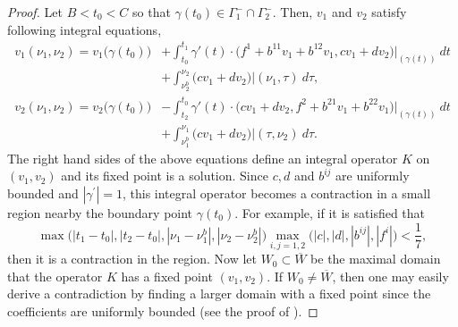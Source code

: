\documentclass[11pt]{amsart}
\theoremstyle{plain}
\numberwithin{equation}{section}
\numberwithin{Thm}{section}
\begin{document}
\begin{proof}
Let $B<t_0<C$ so that $\gamma(t_0) \in \Gamma^-_1 \cap \Gamma^-_2$. Then,
$v_1$ and $v_2$ satisfy following integral equations,
  \begin{align}
    v_1(\nu_1,\nu_2) = v_1\big(\gamma(t_0)\big) &+ \int_{t_0}^{t_1} \gamma'(t) \cdot \big(f^1 + b^{11}v_1 + b^{12} v_1, cv_1 +dv_2 \big)|_{(\gamma(t))} ~dt \label{eqn:int1} \\
    &+\int_{\nu_2^b}^{\nu_2} \big(cv_1 +dv_2 \big)|(\nu_1,\tau) ~d\tau, \nonumber \\
    v_2(\nu_1,\nu_2) = v_2\big(\gamma(t_0)\big) &- \int_{t_2}^{t_0} \gamma'(t) \cdot \big(cv_1 +dv_2, f^2 + b^{21}v_1 + b^{22} v_1 \big)|_{(\gamma(t))} ~dt \label{eqn:int2} \\
    &+\int_{\nu_1^b}^{\nu_1} \big(cv_1 +dv_2 \big)|(\tau,\nu_2) ~d\tau. \nonumber
  \end{align}
The right hand sides of the above equations define an integral operator $K$ on $(v_1,v_2)$ and its fixed point is a solution.  Since $c,d$ and $b^{ij}$ are uniformly bounded and $|\gamma^\prime|=1$, this integral operator becomes a contraction in a small region nearby the boundary point $\gamma(t_0)$. For example, if it is satisfied that
$$
\max \big(|t_1-t_0|, |t_2-t_0|, |\nu_1-\nu_1^b|, |\nu_2-\nu_2^b|\big) \max_{i,j=1,2}\big(|c|,|d|, |b^{ij}|, |f^i|\big) <\frac{1}{7},
$$
then it is a contraction in the region. Now let $W_0\subset \overline W$ be the maximal domain that the operator $K$ has a fixed point $(v_1,v_2)$. If $W_0\ne\overline W$, then one may easily derive a contradiction by finding a larger domain with a fixed point since the coefficients are uniformly bounded (see the proof of \cite[Theorem 2.5]{lee_orthotropic_2015}).


\end{proof}
\end{document}
